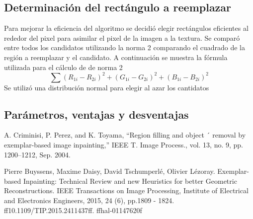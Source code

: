 \documentclass[conference]{IEEEtran}
\begin{document}
\subsection{Determinación del rectángulo a reemplazar}
Para mejorar la eficiencia del algoritmo se decidió elegir rectángulos eficientes al rededor del pixel para asimilar el pixel de la imagen a la textura. Se comparó entre todos los candidatos utilizando la norma 2 comparando el cuadrado de la región a reemplazar y el candidato. A continuación se muestra la fórmula utilizada para el cálculo de de norma 2
\begin{equation}
\sum{(R_{1i}-R_{2i})^2+(G_{1i}-G_{2i})^2+(B_{1i}-B_{2i})^2}
\end{equation}
Se utilizó una distribución normal para elegir al azar los cantidatos 
\subsection{Parámetros, ventajas y desventajas}


\begin{thebibliography}{00}
 A. Criminisi, P. Perez, and K. Toyama, “Region filling and object ´
removal by exemplar-based image inpainting,” IEEE T. Image Process.,
vol. 13, no. 9, pp. 1200–1212, Sep. 2004.

 Pierre Buyssens, Maxime Daisy, David Tschumperlé, Olivier Lézoray. Exemplar-based Inpainting:
Technical Review and new Heuristics for better Geometric Reconstructions. IEEE Transactions on
Image Processing, Institute of Electrical and Electronics Engineers, 2015, 24 (6), pp.1809 - 1824.
ff10.1109/TIP.2015.2411437ff. ffhal-01147620f
\end{thebibliography}
\end{document}

